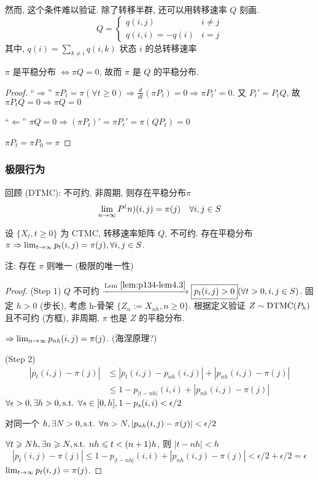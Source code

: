 然而, 这个条件难以验证. 除了转移半群, 还可以用转移速率 $Q$ 刻画.
\[
Q=\begin{cases}
    q(i,j) & i\neq j\\
    q(i,i)=-q(i) & i=j
\end{cases}
\]
其中, $q(i)=\sum_{k\neq i}q(i,k)$ 状态 $i$ 的总转移速率

\begin{lemma}\label{lem:p134-lem4.3}
    $\pi$ 是平稳分布 $\iff \pi Q=0$, 故而 $\pi$ 是 $Q$ 的平稳分布.
\end{lemma}

\begin{proof}
    ``$\Rightarrow$'' $\pi P_t=\pi(\forall t\geq 0)\Rightarrow \frac{d}{dt}(\pi P_t)=0\Rightarrow \pi P_t'=0$. 又 $P_t'=P_t Q$, 故 $\pi P_t Q=0\Rightarrow \pi Q=0$

    ``$\Leftarrow$'' $\pi Q=0\Rightarrow (\pi P_t)'=\pi P_t'=\pi (QP_t)=0$

    $\pi P_t=\pi P_0=\pi$
\end{proof}

\subsubsection{极限行为}

回顾 (DTMC): 不可约, 非周期, 则存在平稳分布$\pi$
\[
\lim_{n \to \infty}P^(n)(i,j)=\pi(j)\quad \forall i,j\in S
\]
\begin{theorem}
    设 $\{X_t,t\geq 0\}$ 为 CTMC, 转移速率矩阵 $Q$, 不可约. 存在平稳分布 $\pi\Rightarrow \lim_{t \to \infty}p_t(i,j)=\pi(j), \forall i,j\in S$.

    注: 存在 $\pi$ 则唯一 (极限的唯一性)
\end{theorem}

\begin{proof}
    (Step 1) $Q$ 不可约 $\xrightarrow{\text{Lem}\ \ref{lem:p134-lem4.3}} \boxed{p_t(i,j)>0}(\forall t>0,i,j\in S)$. 固定 $h>0$ (步长), 考虑 h-骨架 $\{Z_n:=X_{nh},n\geq 0\}$. 根据定义验证 $Z\sim\operatorname{DTMC}(P_h)$ 且不可约 (方框), 非周期, $\pi$ 也是 $Z$ 的平稳分布.

    $\Rightarrow \lim_{n \to \infty}p_{nh}(i,j)=\pi(j)$. (海涅原理?)

    (Step 2) 
    \[
    \begin{aligned}
        |p_t(i,j)-\pi(j)|&\leq |p_t(i,j)-p_{nh}(i,j)|+|p_{nh}(i,j)-\pi(j)|\\
        &\leq 1-p_{|t-nh|}(i,i)+|p_{nh}(i,j)-\pi(j)|
    \end{aligned}
    \]
    $\forall \epsilon>0,\exists h>0,\text{s.t. }\forall s\in [0,h], 1-p_s(i,i)<\epsilon/2$

    对同一个 $h, \exists N>0,\text{s.t. } \forall n>N, |p_{nh}(i,j)-\pi(j)|<\epsilon/2$

    $\forall t\geqslant Nh, \exists n\geqslant N, \text{s.t. } nh\leqslant t<(n+1)h$, 则 $|t-nh|<h$
    \[
    |p_t(i,j)-\pi(j)|\leq 1-p_{|t-nh|}(i,i)+|p_{nh}(i,j)-\pi(j)|<\epsilon/2+\epsilon/2=\epsilon
    \]
    $\lim_{t \to \infty}p_t(i,j)=\pi(j)$.
\end{proof}

